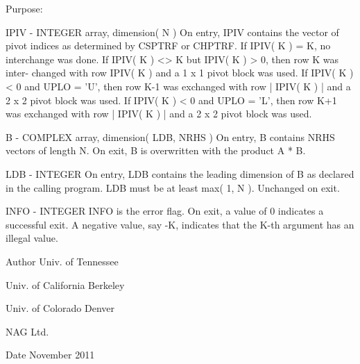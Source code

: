\begin{DoxyParagraph}{Purpose\+: }
\begin{DoxyVerb}
  IPIV   - INTEGER array, dimension( N )
           On entry, IPIV contains the vector of pivot indices as
           determined by CSPTRF or CHPTRF.
           If IPIV( K ) = K, no interchange was done.
           If IPIV( K ) <> K but IPIV( K ) > 0, then row K was inter-
           changed with row IPIV( K ) and a 1 x 1 pivot block was used.
           If IPIV( K ) < 0 and UPLO = 'U', then row K-1 was exchanged
           with row | IPIV( K ) | and a 2 x 2 pivot block was used.
           If IPIV( K ) < 0 and UPLO = 'L', then row K+1 was exchanged
           with row | IPIV( K ) | and a 2 x 2 pivot block was used.

  B      - COMPLEX array, dimension( LDB, NRHS )
           On entry, B contains NRHS vectors of length N.
           On exit, B is overwritten with the product A * B.

  LDB    - INTEGER
           On entry, LDB contains the leading dimension of B as
           declared in the calling program.  LDB must be at least
           max( 1, N ).
           Unchanged on exit.

  INFO   - INTEGER
           INFO is the error flag.
           On exit, a value of 0 indicates a successful exit.
           A negative value, say -K, indicates that the K-th argument
           has an illegal value.\end{DoxyVerb}
 
\end{DoxyParagraph}
\begin{DoxyAuthor}{Author}
Univ. of Tennessee 

Univ. of California Berkeley 

Univ. of Colorado Denver 

N\+A\+G Ltd. 
\end{DoxyAuthor}
\begin{DoxyDate}{Date}
November 2011 
\end{DoxyDate}
\hypertarget{group__complex__lin_gaa9a07089f332e6058c3d983e7e737879}{}
